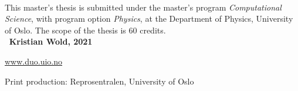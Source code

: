 \textit{} 
\\ [100 pt]
This master's thesis is submitted under the master's program \textit{Computational Science}, with program option \textit{Physics}, at the Department of Physics, University of Oslo. The scope of the thesis is 60 credits.
\\ [350 pt]
\textbf{\faCopyright \, Kristian Wold, 2021}

\href{https://www.duo.uio.no/}{www.duo.uio.no}

Print production: Reprosentralen, University of Oslo